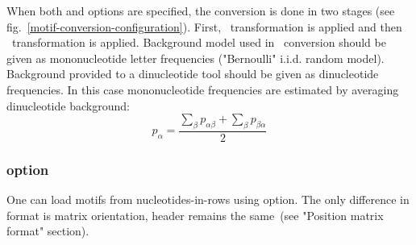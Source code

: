 


When both  and  options are specified, the conversion is done in two stages (see fig.~\ref{motif-conversion-configuration}). First, \PcmToPwm\ transformation is applied and then \PwmToDiPwm\ transformation is applied. 
Background model used in \PcmToPwm\ conversion should be given as mononucleotide letter frequencies ("Bernoulli" i.i.d. random model). Background provided to a dinucleotide tool should be given as dinucleotide frequencies. In this case mononucleotide frequencies are estimated by averaging dinucleotide background:
$$p_{\alpha} = \frac{\sum_{\beta}p_{\alpha\beta} + \sum_{\beta}p_{\beta\alpha}}{2}$$


\subsubsection{ option}\label{TransposeOption}
One can load motifs from nucleotides-in-rows using  option. The only difference in format is matrix orientation, header remains the same~(see "Position matrix format" section).

